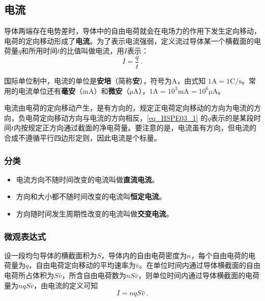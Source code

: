 

\subsection{电流}

导体两端存在电势差时，导体中的自由电荷就会在电场力的作用下发生定向移动，电荷的定向移动形成了\textbf{电流}。为了表示电流强弱，定义流过导体某一个横截面的电荷量$q$和所用时间$t$的比值叫做电流，用$I$表示：
\begin{equation}\label{eq_HSPE03_1}
I = \frac{q}{t}~.
\end{equation}

国际单位制中，电流的单位是\textbf{安培}（简称\textbf{安}），符号为$\mathrm{A}$，由式知 $1\mathrm{A} = 1\mathrm{C}/\mathrm{s}$。常用的电流单位还有\textbf{毫安}（$\mathrm{mA}$）和\textbf{微安}（$\mathrm{\mu A}$），$1\mathrm{A}=10^3\mathrm{mA}=10^6\mathrm{\mu A}$。

电流由电荷的定向移动产生，是有方向的，规定正电荷定向移动的方向为电流的方向，负电荷定向移动方向与电流的方向相反，\autoref{eq_HSPE03_1} 的$q$表示的是某段时间$t$内按规定正方向通过截面的净电荷量。要注意的是，电流虽有方向，但电流的合成不遵循平行四边形定则，因此电流是个标量。

\subsubsection{分类}
\begin{itemize}
\item 电流方向不随时间改变的电流叫做\textbf{直流电流}。
\item 方向和大小都不随时间改变的电流叫\textbf{恒定电流}。
\item 方向随时间发生周期性改变的电流叫做\textbf{交变电流}。
\end{itemize}

\subsubsection{微观表达式}

设一段均匀导体的横截面积为$S$，导体内的自由电荷密度为$n$，每个自由电荷的电荷量为$q$，自由电荷定向移动的平均速率为$\bar v$。在单位时间内通过导体横截面的自由电荷所占体积为$S\bar v $，所含自由电荷数为$nS\bar v $，则单位时间内通过导体横截面的电荷量为$nqS\bar v$，由电流的定义可知
\begin{equation}
I=nqS\bar v~.
\end{equation}

